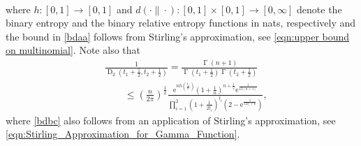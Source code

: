 \documentclass[journal, 10pt]{IEEEtran}
\newcommand{\rme}{\mathrm{e}}
\theoremstyle{plain}
\theoremstyle{plain}
\theoremstyle{plain}
\theoremstyle{plain}
\newcommand{\opD}{\operatorname{D}}
\newcommand{\opGamma}{\operatorname{\Gamma}}
\begin{document}
\begin{IEEEproof}
\begin{align}
\end{align}
where $h \colon [0,1]\to [0,1]$ and $d(\cdot \| \cdot ) \colon [0,1]\times [0,1] \to [0,\infty]$ denote the binary entropy and the binary relative entropy functions in nats, respectively and the bound in \eqref{bdaa} follows from Stirling's approximation, see \eqref{eqn:upper bound on multinomial}. Note also that
\begin{align}
&\frac{1}{\opD_2(t_1+\frac12, t_2+\frac12)} = \frac{\opGamma(n+1) }{\opGamma(t_1+\frac12) \opGamma(t_2+\frac12) } \\
&\qquad \le  \left( \frac{n}{2\pi}  \right)^\frac{1}{2}  \frac{\rme^{n  h\left( \frac{t_1}{n} \right)}\left( 1+\frac{1}{n} \right)^{n+\frac{1}{2}}\rme^{\frac{1}{12(n+1)}}}{\prod_{i=1}^2 \left( 1+\frac{1}{2t_i} \right)^{t_i}\left( 2-\rme^{\frac{1}{12t_i+6}} \right) } \text{,} \label{bdbc}
\end{align}
 where \eqref{bdbc} also follows from an application of Stirling's approximation, see \eqref{eqn:Stirling_Approximation_for_Gamma_Function}.


\end{IEEEproof}
\end{document}
